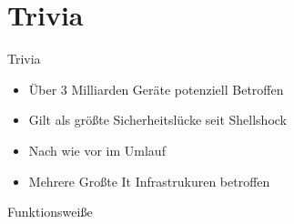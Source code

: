 \documentclass{beamer}
\begin{document}
\section{Trivia}
\begin{frame}{Trivia}
 \begin{itemize}
  \item Über 3 Milliarden Geräte potenziell Betroffen
  \item Gilt als größte Sicherheitslücke seit Shellshock
  \item Nach wie vor im Umlauf
  \item Mehrere Großte It Infrastrukuren betroffen
  
  
 \end{itemize}

\end{frame}


\begin{frame}{Funktionsweiße}
 
\end{frame}
\end{document}
